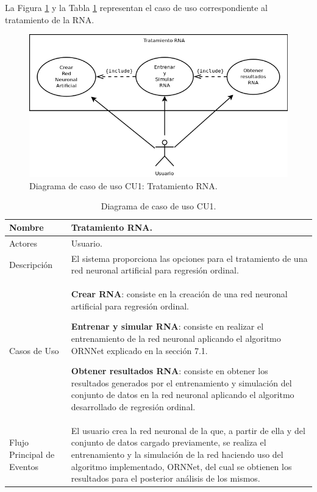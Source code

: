 			La Figura \ref{fig:CU1} y la Tabla \ref{tab:CU1} representan el caso de uso correspondiente al tratamiento de la RNA.\\
			
			\begin{figure}[!h]
				\centering
				\includegraphics[scale=0.5]{uml/DiagramaNivel1.png}
				\caption{Diagrama de caso de uso CU1: Tratamiento RNA.}
				\label{fig:CU1}
			\end{figure}
			
			\begin{table}[!h]
				\centering
				\begin{tabular}{l|p{.5\linewidth}}
					\hline Nombre & Tratamiento RNA. \\ 
					\hline Actores & Usuario. \\ 
					\hline Descripción & El sistema proporciona las opciones para el tratamiento de una red neuronal artificial para regresión ordinal. \\ 
					\hline Casos de Uso & \textbf{Crear RNA}: consiste en la creación de una red neuronal artificial para regresión ordinal.
					
					\textbf{Entrenar y simular RNA}: consiste en realizar el entrenamiento de la red neuronal aplicando el algoritmo ORNNet explicado en la sección 7.1.
					
					\textbf{Obtener resultados RNA}: consiste en obtener los resultados generados por el entrenamiento y simulación del conjunto de datos en la red neuronal aplicando el algoritmo desarrollado de regresión ordinal. \\ 
					\hline Flujo Principal de Eventos & El usuario crea la red neuronal de la que, a partir de ella y del conjunto de datos cargado previamente, se realiza el entrenamiento y la simulación de la red haciendo uso del algoritmo implementado, ORNNet, del cual se obtienen los resultados para el posterior análisis de los mismos. \\ 
					\hline 
				\end{tabular}
				\caption{Diagrama de caso de uso CU1.}
				\label{tab:CU1}
			\end{table}

